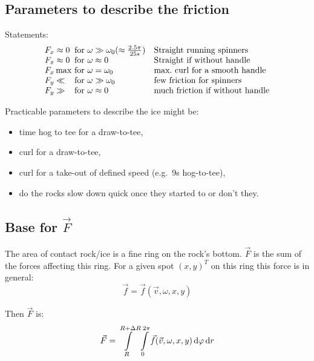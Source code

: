 \subsection{Parameters to describe the friction}

Statements:
\begin{equation}\begin{array}{l@{\textrm{ for }}ll}
F_x \approx 0 & \omega \gg \omega_0 (\approx \frac{2.5\pi}{25s}) & \textrm{Straight running spinners} \\
F_x \approx 0 & \omega \approx 0    & \textrm{Straight if without handle} \\
F_x \max      & \omega = \omega_0   & \textrm{max.\ curl for a smooth handle} \\
F_y \ll       & \omega \gg \omega_0 & \textrm{few friction for spinners} \\
F_y \gg       & \omega \approx 0    & \textrm{much friction if without handle} \\
\end{array}\end{equation}

Practicable parameters to describe the ice might be:
\begin{itemize}
\item time hog to tee for a draw-to-tee,
\item curl for a draw-to-tee,
\item curl for a take-out of defined speed (e.g.\ 9s hog-to-tee),
\item do the rocks slow down quick once they started to or don't they.
\end{itemize}

\subsection{Base for $ \vec{ F } $}

The area of contact rock/ice is a fine ring on the rock's bottom. $ \vec{ F } $
is the sum of the forces affecting this ring. For a given spot $ (x,y)^T $
on this ring this force is in general:
\begin{equation}
    \vec{f} = \vec{f}(\vec{v}, \omega, x, y )
\end{equation}

Then $ \vec{ F } $ is:
\begin{equation}
    \vec{F} = \int\limits_R^{R+\Delta R} \int\limits_0^{2\pi}
                  \vec{f}(\vec{v}, \omega, x, y )
              \,\mathrm{d}{\varphi} \,\mathrm{d}{r}
\end{equation}
